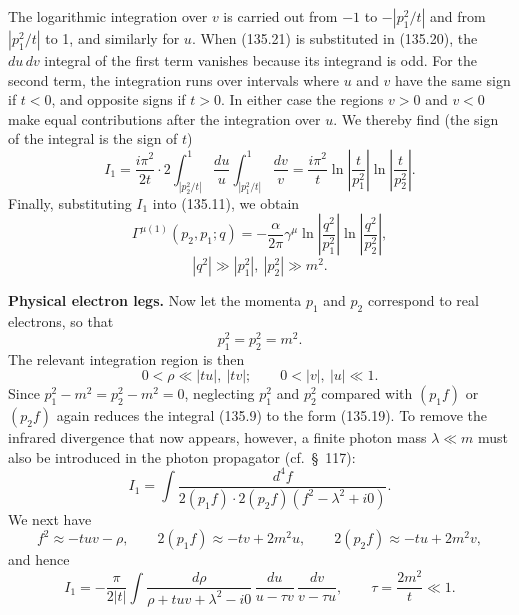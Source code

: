 The logarithmic integration over $v$ is carried out from $-1$ to $-|p_1^2/t|$ and from $|p_1^2/t|$ to 1, and similarly for $u$. When (135.21) is substituted in (135.20), the $du\,dv$ integral of the first term vanishes because its integrand is odd. For the second term, the integration runs over intervals where $u$ and $v$ have the same sign if $t<0$, and opposite signs if $t>0$. In either case the regions $v>0$ and $v<0$ make equal contributions after the integration over $u$. We thereby find (the sign of the integral is the sign of $t$)
\begin{equation}
I_1=\frac{i\pi^2}{2t}\cdot2
\int_{|p_2^2/t|}^1\frac{du}{u}
\int_{|p_1^2/t|}^1\frac{dv}{v}
=\frac{i\pi^2}{t}\ln\left|\frac{t}{p_1^2}\right|\ln\left|\frac{t}{p_2^2}\right|.
\tag{135.22}
\end{equation}
Finally, substituting $I_1$ into (135.11), we obtain
\begin{equation}
\Gamma^{\mu(1)}(p_2,p_1;q)=-\frac{\alpha}{2\pi}\gamma^\mu
\ln\left|\frac{q^2}{p_1^2}\right|\ln\left|\frac{q^2}{p_2^2}\right|,
\tag{135.23}
\end{equation}
\[
|q^2|\gg|p_1^2|,\ |p_2^2|\gg m^2.
\]

\textbf{Physical electron legs.} Now let the momenta $p_1$ and $p_2$ correspond to real electrons, so that
\begin{equation}
p_1^2=p_2^2=m^2.
\tag{135.24}
\end{equation}
The relevant integration region is then
\begin{equation}
0<\rho\ll|tu|,\ |tv|;\qquad 0<|v|,\ |u|\ll1.
\tag{135.25}
\end{equation}
Since $p_1^2-m^2=p_2^2-m^2=0$, neglecting $p_1^2$ and $p_2^2$ compared with $(p_1f)$ or $(p_2f)$ again reduces the integral (135.9) to the form (135.19). To remove the infrared divergence that now appears, however, a finite photon mass $\lambda\ll m$ must also be introduced in the photon propagator (cf.\ \S~117):
\begin{equation}
I_1=\int\frac{d^4f}{2(p_1f)\cdot2(p_2f)(f^2-\lambda^2+i0)}.
\tag{135.26}
\end{equation}
We next have
\[
f^2\approx-tuv-\rho,\qquad
2(p_1f)\approx-tv+2m^2u,\qquad
2(p_2f)\approx-tu+2m^2v,
\]
and hence
\begin{equation}
I_1=-\frac{\pi}{2|t|}\int
\frac{d\rho}{\rho+tuv+\lambda^2-i0}\,
\frac{du}{u-\tau v}\,\frac{dv}{v-\tau u},
\qquad \tau=\frac{2m^2}{t}\ll1.
\tag{135.27}
\end{equation}

